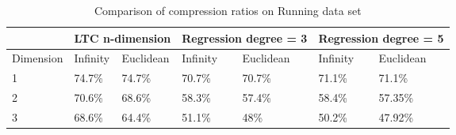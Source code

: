 \begin{table}
\begin{tabular}{|l|l|l|l|l|l|l|l|}
\hline
           & \multicolumn{2}{c|}{LTC n-dimension} & \multicolumn{2}{c|}{Regression degree = 3} & \multicolumn{3}{l|}{Regression degree = 5}          \\ \hline
Dimension & Infinity   & Euclidean   & Infinity            & Euclidean           & Infinity& \multicolumn{2}{l|}{Euclidean} \\ \hline
1          & 74.7\%     & 74.7\%      & 70.7\%      & 70.7\%        & 71.1\%        & \multicolumn{2}{l|}{71.1\%}    \\ \hline
2          & 70.6\%     & 68.6\%      & 58.3\%      & 57.4\%        & 58.4\%        & \multicolumn{2}{l|}{57.35\%}   \\ \hline
3          & 68.6\%     & 64.4\%      & 51.1\%      & 48\%          & 50.2\%        & \multicolumn{2}{l|}{47.92\%}   \\ \hline
\end{tabular}
\caption{Comparison of compression ratios on Running data set}
\label{table:CR-compare-running}
\end{table}

